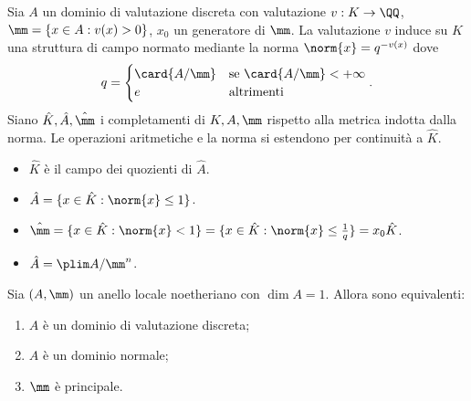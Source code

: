 \begin{proposition}
Sia $A$ un dominio di valutazione discreta con valutazione $\map{v}{K}{\QQ}$, $\mm=\{x\in A:v(x)>0\}$, $x_0$ un generatore di $\mm$. La valutazione $v$ induce su $K$ una struttura di campo normato mediante la norma $\norm{x}=q^{-v(x)}$ dove
$$
q=
\begin{cases}
\card{A/\mm}&\text{se $\card{A/\mm}<+\infty$}\\
e&\text{altrimenti}
\end{cases}.
$$
Siano $\hat{K},\hat{A},\hat{\mm}$ i completamenti di $K,A,\mm$ rispetto alla metrica indotta dalla norma. Le operazioni aritmetiche e la norma si estendono per continuità a $\hat{K}$.
\begin{itemize}
\item $\hat{K}$ è il campo dei quozienti di $\hat{A}$.
\item $\hat{A}=\{x\in\hat{K}:\norm{x}\le 1\}$.
\item $\hat{\mm}=\{x\in\hat{K}:\norm{x}<1\}=\{x\in\hat{K}:\norm{x}\le\frac{1}{q}\}=x_0\hat{K}$.
\item $\hat{A}=\plim A/\mm^n$.
\end{itemize}

\end{proposition}

\begin{proposition}
Sia $(A,\mm)$ un anello locale noetheriano con $\dim A=1$. Allora sono equivalenti:
\begin{enumerate}
\item $A$ è un dominio di valutazione discreta;
\item $A$ è un dominio normale;
\item $\mm$ è principale.
\end{enumerate}
\end{proposition}